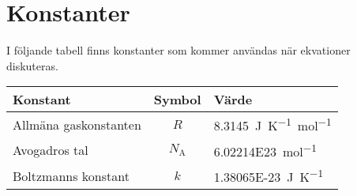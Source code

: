 \section{Konstanter}

I följande tabell finns konstanter som kommer användas när ekvationer diskuteras.

\begin{table}[!h]
	\begin{tabular}{| l | c | l |}
		\hline
		\textbf{Konstant} & \multicolumn{1}{|l|}{\textbf{Symbol}} & \multicolumn{1}{|l|}{\textbf{Värde}} \\
		\hline
		Allmäna gaskonstanten & $R$           & \SI{8.3145}{\joule~\kelvin^{-1}~\mol^{-1}} \\
		\hline
		Avogadros tal         & $N_\text{A}$  & \SI{6.02214E23}{\mol^{-1}} \\
		\hline
		Boltzmanns konstant   & $k$           & \SI{1.38065E-23}{\joule~\kelvin^{-1}} \\
		\hline
	\end{tabular}
\end{table}

\twocolumn